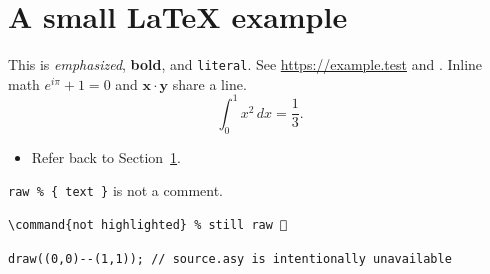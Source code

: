 \documentclass[11pt]{article}
\newcommand{\vect}[1]{\mathbf{#1}}
\begin{document}
\section{A small \LaTeX{} example}\label{sec:intro}
This is \emph{emphasized}, \textbf{bold}, and \texttt{literal}.
See \url{https://example.test} and \cite[p.~7]{knuth:1984}.
Inline math $e^{i\pi}+1=0$ and \(\vect{x}\cdot\vect{y}\) share a line.
\[
  \int_0^1 x^2\,dx = \frac{1}{3}.
\]
\begin{itemize}
  \item Refer back to Section~\ref{sec:intro}.
\end{itemize}
\verb|raw % { text }| is not a comment.
\begin{verbatim}
\command{not highlighted} % still raw 🚀
\end{verbatim}
\begin{verbatim}
draw((0,0)--(1,1)); // source.asy is intentionally unavailable
\end{verbatim}
\end{document}
